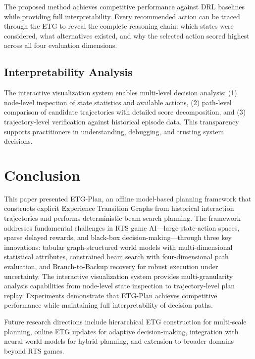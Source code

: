 \documentclass[letterpaper]{article}
\begin{document}
The proposed method achieves competitive performance against DRL baselines while providing full interpretability. Every recommended action can be traced through the ETG to reveal the complete reasoning chain: which states were considered, what alternatives existed, and why the selected action scored highest across all four evaluation dimensions.

\subsection{Interpretability Analysis}

The interactive visualization system enables multi-level decision analysis: (1) node-level inspection of state statistics and available actions, (2) path-level comparison of candidate trajectories with detailed score decomposition, and (3) trajectory-level verification against historical episode data. This transparency supports practitioners in understanding, debugging, and trusting system decisions.


\section{Conclusion}
\label{sec:conclusion}

This paper presented ETG-Plan, an offline model-based planning framework that constructs explicit Experience Transition Graphs from historical interaction trajectories and performs deterministic beam search planning. The framework addresses fundamental challenges in RTS game AI---large state-action spaces, sparse delayed rewards, and black-box decision-making---through three key innovations: tabular graph-structured world models with multi-dimensional statistical attributes, constrained beam search with four-dimensional path evaluation, and Branch-to-Backup recovery for robust execution under uncertainty. The interactive visualization system provides multi-granularity analysis capabilities from node-level state inspection to trajectory-level plan replay. Experiments demonstrate that ETG-Plan achieves competitive performance while maintaining full interpretability of decision paths.

Future research directions include hierarchical ETG construction for multi-scale planning, online ETG updates for adaptive decision-making, integration with neural world models for hybrid planning, and extension to broader domains beyond RTS games.


\end{document}
